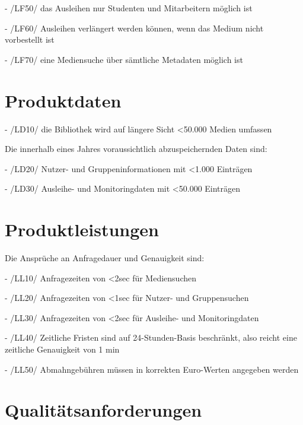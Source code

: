 \documentclass[12pt, a4paper]{article}
\begin{document}
- /LF50/ das Ausleihen nur Studenten und Mitarbeitern möglich ist

- /LF60/ Ausleihen verlängert werden können, wenn das Medium nicht vorbestellt ist

- /LF70/ eine Mediensuche über sämtliche Metadaten möglich ist
\section{Produktdaten}

- /LD10/ die Bibliothek wird auf längere Sicht <50.000 Medien umfassen


Die innerhalb eines Jahres voraussichtlich abzuspeichernden Daten sind:

- /LD20/ Nutzer- und Gruppeninformationen mit <1.000 Einträgen

- /LD30/ Ausleihe- und Monitoringdaten mit <50.000 Einträgen
\section{Produktleistungen}
Die Ansprüche an Anfragedauer und Genauigkeit sind:

- /LL10/ Anfragezeiten von <2sec für Mediensuchen

- /LL20/ Anfragezeiten von <1sec für Nutzer- und Gruppensuchen

- /LL30/ Anfragezeiten von <2sec für Ausleihe- und Monitoringdaten

- /LL40/ Zeitliche Fristen sind auf 24-Stunden-Basis beschränkt, also reicht eine zeitliche Genauigkeit von 1 min

- /LL50/ Abmahngebühren müssen in korrekten Euro-Werten angegeben werden

\section{Qualitätsanforderungen}
\end{document}
